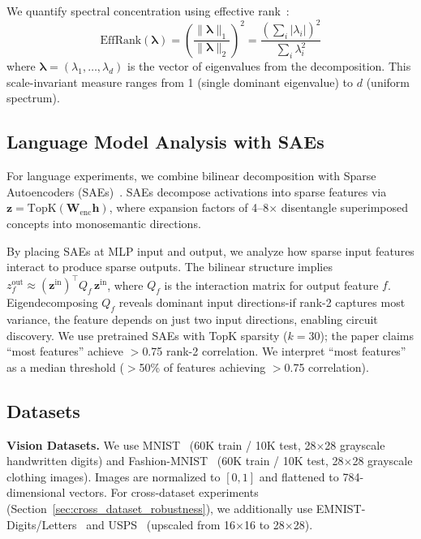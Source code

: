 We quantify spectral concentration using effective rank~\citep{roy2007effective}:
\begin{equation}
    \text{EffRank}(\boldsymbol{\lambda}) = \left( \frac{\|\boldsymbol{\lambda}\|_1}{\|\boldsymbol{\lambda}\|_2} \right)^2 = \frac{\left(\sum_i |\lambda_i|\right)^2}{\sum_i \lambda_i^2}
    \label{eq:effrank}
\end{equation}
where $\boldsymbol{\lambda} = (\lambda_1, \ldots, \lambda_d)$ is the vector of eigenvalues from the decomposition.
This scale-invariant measure ranges from 1 (single dominant eigenvalue) to $d$ (uniform spectrum).

\subsection{Language Model Analysis with SAEs}
\label{sec:language_method}

For language experiments, we combine bilinear decomposition with Sparse Autoencoders (SAEs)~\citep{bricken2023monosemanticity}.
SAEs decompose activations into sparse features via $\mathbf{z} = \text{TopK}(\mathbf{W}_{\text{enc}} \mathbf{h})$, where expansion factors of 4--8$\times$ disentangle superimposed concepts into monosemantic directions.

By placing SAEs at MLP input and output, we analyze how sparse input features interact to produce sparse outputs.
The bilinear structure implies $z^{\text{out}}_f \approx (\mathbf{z}^{\text{in}})^\top Q_f \, \mathbf{z}^{\text{in}}$, where $Q_f$ is the interaction matrix for output feature $f$.
Eigendecomposing $Q_f$ reveals dominant input directions-if rank-2 captures most variance, the feature depends on just two input directions, enabling circuit discovery.
We use pretrained SAEs with TopK sparsity ($k=30$); the paper claims ``most features'' achieve $>$0.75 rank-2 correlation.
We interpret ``most features'' as a median threshold ($>$50\% of features achieving $>$0.75 correlation).

\subsection{Datasets}
\label{sec:datasets}

\textbf{Vision Datasets.}
We use MNIST~\citep{lecun1998gradient} (60K train / 10K test, 28$\times$28 grayscale handwritten digits) and Fashion-MNIST~\citep{xiao2017fashion} (60K train / 10K test, 28$\times$28 grayscale clothing images).
Images are normalized to $[0,1]$ and flattened to 784-dimensional vectors.
For cross-dataset experiments (Section~\ref{sec:cross_dataset_robustness}), we additionally use EMNIST-Digits/Letters~\citep{cohen2017emnist} and USPS~\citep{hull1994database} (upscaled from 16$\times$16 to 28$\times$28).

